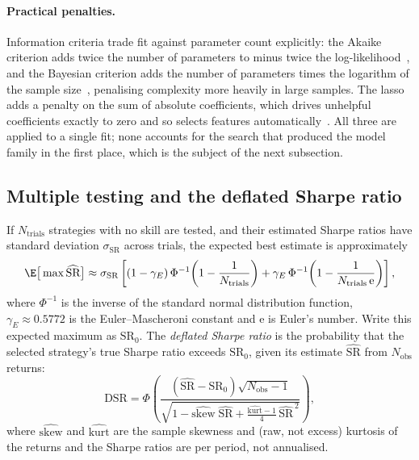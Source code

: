 \paragraph{Practical penalties.} Information criteria trade fit against parameter count explicitly:
the Akaike criterion adds twice the number of parameters to minus twice the log-likelihood~\citep{akaike1974},
and the Bayesian criterion adds the number of parameters times the logarithm of the sample
size~\citep{schwarz1978}, penalising complexity more heavily in large samples. The lasso adds a penalty
on the sum of absolute coefficients, which drives unhelpful coefficients exactly to zero and so selects
features automatically~\citep{tibshirani1996}. All three are applied to a single fit; none accounts for
the search that produced the model family in the first place, which is the subject of the next
subsection.

\subsection{Multiple testing and the deflated Sharpe ratio}

If $N_{\text{trials}}$ strategies with no skill are tested, and their estimated Sharpe ratios have
standard deviation $\sigma_{\text{SR}}$ across trials, the expected best estimate is
approximately~\citep{bailey2014}
\begin{equation}
  \E\big[\max \widehat{\text{SR}}\big] \approx \sigma_{\text{SR}}
  \left[(1-\gamma_E)\,\Phi^{-1}\!\left(1 - \frac{1}{N_{\text{trials}}}\right)
  + \gamma_E\, \Phi^{-1}\!\left(1 - \frac{1}{N_{\text{trials}}\, \mathrm{e}}\right)\right],
\end{equation}
where $\Phi^{-1}$ is the inverse of the standard normal distribution function, $\gamma_E \approx 0.5772$
is the Euler--Mascheroni constant and $\mathrm{e}$ is Euler's number.
 Write this expected maximum as
$\text{SR}_0$. The \emph{deflated Sharpe ratio} is the probability that the selected strategy's true
Sharpe ratio exceeds $\text{SR}_0$, given its estimate $\widehat{\text{SR}}$ from $N_{\text{obs}}$
returns:
\begin{equation}
  \text{DSR} = \Phi\!\left(\frac{(\widehat{\text{SR}} - \text{SR}_0)\sqrt{N_{\text{obs}} - 1}}
  {\sqrt{1 - \widehat{\text{skew}}\;\widehat{\text{SR}} + \frac{\widehat{\text{kurt}} - 1}{4}\,\widehat{\text{SR}}^{\,2}}}\right),
\end{equation}
where $\widehat{\text{skew}}$ and $\widehat{\text{kurt}}$ are the sample skewness and (raw, not excess)
kurtosis of the returns and the Sharpe ratios are per period, not annualised.

